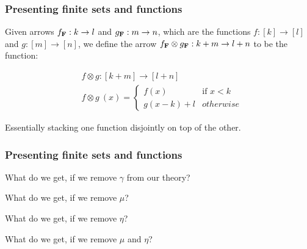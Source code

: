 \documentclass[t, pdftex]{beamer}
\begin{document}
\begin{frame}
    \frametitle{Presenting finite sets and functions}
    Given arrows $f_{\bf{F}} : k \to l$ and $g_{\bf{F}} : m \to n$, which are the functions $f : [k] \to [l]$ and $g : [m] \to [n]$, we define the arrow $f_{\bf{F}} \otimes g_{\bf{F}} : k+m \to l+n$ to be the function:
    \vspace{-0.3cm}
    \begin{center}
    \begin{align*}
        &f \otimes g : [k+m] \to [l+n]\\
        &f \otimes g\ (x) = \begin{cases}
            f(x) & \text{if }x < k\\
            g(x-k) +l & otherwise
        \end{cases}
    \end{align*}
    \end{center}
    Essentially stacking one function disjointly on top of the other.\par

\end{frame}

\begin{frame}
    \frametitle{Presenting finite sets and functions}
    \vspace*{\fill}
    \begin{center}
        What do we get, if we remove $\gamma$ from our theory?\\
        \par
        What do we get, if we remove $\mu$?\\
        \par
        What do we get, if we remove $\eta$?\\
        \par
        What do we get, if we remove $\mu$ and $\eta$?\\
    \end{center}
    \vspace*{\fill}
\end{frame}
\end{document}
